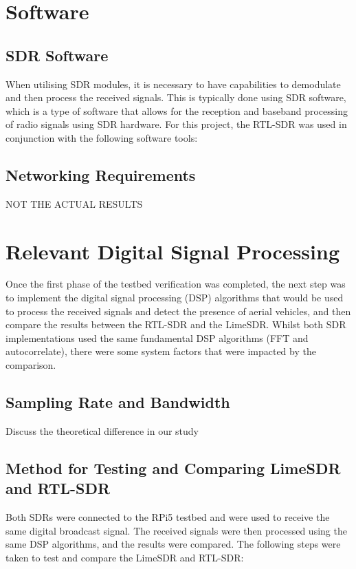 \section{Software}

\subsection{SDR Software \label{sec:SDRsoftware}}
When utilising SDR modules, it is necessary to have capabilities to demodulate and then process the received signals. This is typically done using SDR software, which is a type of software that allows for the reception and baseband processing of radio signals using SDR hardware. For this project, the RTL-SDR was used in conjunction with the following software tools:


\subsection{Networking Requirements \label{sec:networking}}


 NOT THE ACTUAL RESULTS
\section{Relevant Digital Signal Processing}

Once the first phase of the testbed verification was completed, the next step was to implement the digital signal processing (DSP) algorithms that would be used to process the received signals and detect the presence of aerial vehicles, and then compare the results between the RTL-SDR and the LimeSDR. Whilst both SDR implementations used the same fundamental DSP algorithms (FFT and autocorrelate), there were some system factors that were impacted by the comparison. 

\subsection{Sampling Rate and Bandwidth}
Discuss the theoretical difference in our study

\subsection{Method for Testing and Comparing LimeSDR and RTL-SDR}
Both SDRs were connected to the RPi5 testbed and were used to receive the same digital broadcast signal. The received signals were then processed using the same DSP algorithms, and the results were compared. The following steps were taken to test and compare the LimeSDR and RTL-SDR:




